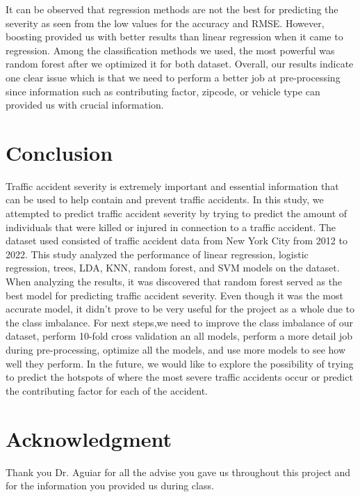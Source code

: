 \documentclass[conference]{IEEEtran}
\begin{document}
	\begin{table}[H]
		\centering
		\caption{Results for the regression models}
	\end{table}
	It can be observed that regression methods are not the best for predicting the severity as seen from the low values for the accuracy and RMSE. However, boosting provided us with better results than linear regression when it came to regression. Among the classification methods we used, the most powerful was random forest after we optimized it for both dataset. Overall, our results indicate one clear issue which is that we need to perform a better job at pre-processing since information such as contributing factor, zipcode, or vehicle type can provided us with crucial information. 
\section{Conclusion}
Traffic accident severity is extremely important and essential information that can be used to help contain and prevent traffic accidents. In this study, we attempted to predict traffic accident severity by trying to predict the amount of individuals that were killed or injured in connection to a traffic accident. The dataset used consisted of traffic accident data from New York City from 2012 to 2022. This study analyzed the performance of linear regression, logistic regression, trees, LDA, KNN, random forest, and SVM models on the dataset. When analyzing the results, it was discovered that random forest served as the best model for predicting traffic accident severity. Even though it was the most accurate model, it didn’t prove to be very useful for the project as a whole due to the class imbalance. For next steps,we need to improve the class imbalance of our dataset, perform 10-fold cross validation an all models, perform a more detail job during pre-processing, optimize all the models, and use more models to see how well they perform. In the future, we would like to explore the possibility of trying to predict the hotspots of where the most severe traffic accidents occur or predict the contributing factor for each of the accident.
\section*{Acknowledgment}
Thank you Dr. Aguiar for all the advise you gave us throughout this project and for the information you provided us during class.


\vspace{12pt}
\end{document}
